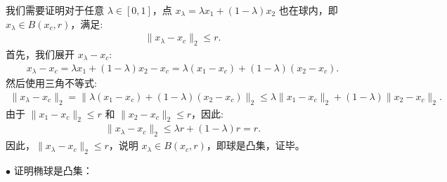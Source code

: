 \documentclass[UTF8]{ctexart}
\begin{document}
\begin{enumerate}
		我们需要证明对于任意 \(\lambda \in [0, 1]\)，点 \(x_\lambda = \lambda x_1 + (1 - \lambda) x_2\) 也在球内，即 \(x_\lambda \in B(x_c, r)\)，满足:
		\begin{align*}
			\|x_\lambda - x_c\|_2 \leq r.
		\end{align*}
		首先，我们展开 \(x_\lambda - x_c\):
		\begin{align*}
			x_\lambda - x_c = \lambda x_1 + (1 - \lambda) x_2 - x_c = \lambda (x_1 - x_c) + (1 - \lambda) (x_2 - x_c).
		\end{align*}
		然后使用三角不等式:
		\begin{align*}
		\|x_\lambda - x_c\|_2 = \| \lambda(x_1 - x_c) + (1 - \lambda)(x_2 - x_c)\|_2 \leq \lambda \|x_1 - x_c\|_2 + (1 - \lambda) \|x_2 - x_c\|_2.
		\end{align*}
		由于 \(\|x_1 - x_c\|_2 \leq r\) 和 \(\|x_2 - x_c\|_2 \leq r\)，因此:
		\begin{align*}
			\|x_\lambda - x_c\|_2 \leq \lambda r + (1 - \lambda) r = r.
		\end{align*}
		因此，\(\|x_\lambda - x_c\|_2 \leq r\)，说明 \(x_\lambda \in B(x_c, r)\)，即球是凸集，证毕。

		$\bullet$ 证明椭球是凸集：


\end{enumerate}
\end{document}
